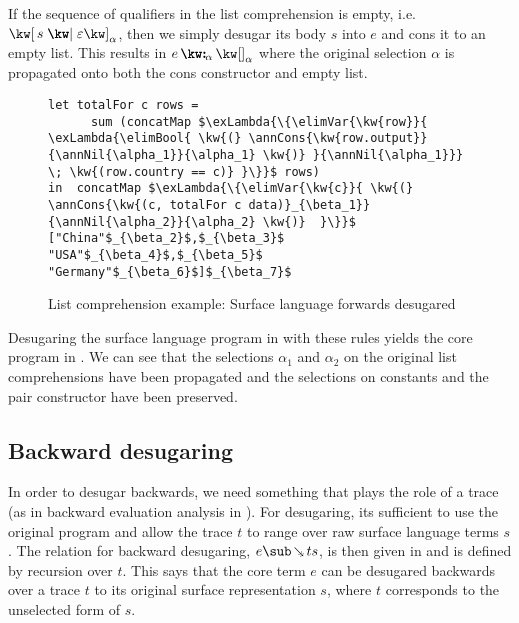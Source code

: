 If the sequence of qualifiers in the list comprehension is empty, i.e. $\annListComp{s}{\seqEmpty}{\alpha}$, then we simply desugar its body $s$ into $e$ and cons it to an empty list. This results in $\annCons{e}{\annNil{\alpha}}{\alpha}$ where the original selection $\alpha$ is propagated onto both the cons constructor and empty list.

\begin{figure}[H]
\small
\begin{lstlisting}
let totalFor c rows =
      sum (concatMap $\exLambda{\{\elimVar{\kw{row}}{  \exLambda{\elimBool{ \kw{(} \annCons{\kw{row.output}}{\annNil{\alpha_1}}{\alpha_1} \kw{)} }{\annNil{\alpha_1}}} \; \kw{(row.country == c)} }\}}$ rows)
in  concatMap $\exLambda{\{\elimVar{\kw{c}}{ \kw{(} \annCons{\kw{(c, totalFor c data)}_{\beta_1}}{\annNil{\alpha_2}}{\alpha_2} \kw{)}  }\}}$ ["China"$_{\beta_2}$,$_{\beta_3}$ "USA"$_{\beta_4}$,$_{\beta_5}$ "Germany"$_{\beta_6}$]$_{\beta_7}$
\end{lstlisting}
\caption{List comprehension example: Surface language forwards desugared}
\label{fig:surface-language:example-4}
\end{figure}

\noindent
Desugaring the surface language program in  with these rules yields the core program in . We can see that the selections $\alpha_1$ and $\alpha_2$ on the original list comprehensions have been propagated and the selections on constants and the pair constructor have been preserved.

\subsection{Backward desugaring}

In order to desugar backwards, we need something that plays the role of a trace (as in backward evaluation analysis in ). For desugaring, its sufficient to use the original program and allow the trace $t$ to range over raw surface language terms $s$. The relation for backward desugaring, $e \desugarBwdR{t} s$, is then given in  and is defined by recursion over $t$. This says that the core term $e$ can be desugared backwards over a trace $t$ to its original surface representation $s$, where $t$ corresponds to the unselected form of $s$.



